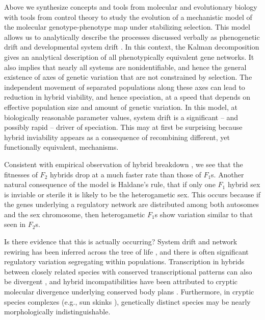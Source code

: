 \documentclass{article}
\newcommand{\plr}[1]{\todo[color=blue!25]{#1}}
\newcommand{\plr}[1]{{\color{blue}\it #1}}
\newcommand{\1}{\mathbbm{1}}
\begin{document}
Above we synthesize concepts and tools from molecular and evolutionary biology with tools from control theory
to study the evolution of a mechanistic model of the molecular genotype-phenotype map under stabilizing selection.
This model allows us to analytically describe the processes discussed verbally as
phenogenetic drift \citep{weiss2000phenogenetic} and developmental system drift \citep{true2001developmental}.
In this context, the Kalman decomposition \citep{kalman1963mathematical}
gives an analytical description of all phenotypically equivalent gene networks.
It also implies that nearly all systems are nonidentifiable,
and hence the general existence of axes of genetic variation that are not constrained by selection.
The independent movement of separated populations along these axes
can lead to reduction in hybrid viability, and hence speciation,
at a speed that depends on effective population size and amount of genetic variation. 
In this model, at biologically reasonable parameter values,
system drift is a significant -- and possibly rapid -- driver of speciation.
This may at first be surprising because
hybrid inviability appears as a consequence of recombining different, yet functionally equivalent, mechanisms. 

Consistent with empirical observation of hybrid breakdown \citep[e.g.][]{plotner2017chlorosis}, 
we see that the fitnesses of $F_2$ hybrids drop at a much faster rate than those of $F_1$s.
Another natural consequence of the model is Haldane's rule,
that if only one $F_1$ hybrid sex is inviable or sterile it is likely to be the heterogametic sex.
This occurs because if the genes underlying a regulatory network are distributed among both autosomes and the sex chromosome, 
then heterogametic $F_1$s show variation similar to that seen in $F_2$s.

Is there evidence that this is actually occurring?
System drift and network rewiring has been inferred across the tree of life \citep{wotton2015quantitative, crombach2016gap, dalal2017transcription, johnson2017rewiring, ali2017quantitative},
and there is often significant regulatory variation segregating within populations.
Transcription in hybrids between closely related species with conserved transcriptional patterns can also be divergent 
\citep{haerty2006gene, maheshwari2012cis, coolon2014tempo, michalak2004association, mack2016gene}, and hybrid incompatibilities have been attributed to cryptic molecular divergence underlying conserved body plans \citep{gavin2013embryonic}. 
Furthermore, in cryptic species complexes (e.g., sun skinks \citep{barley2013challenge}),
genetically distinct species
may be nearly morphologically indistinguishable.
\end{document}
